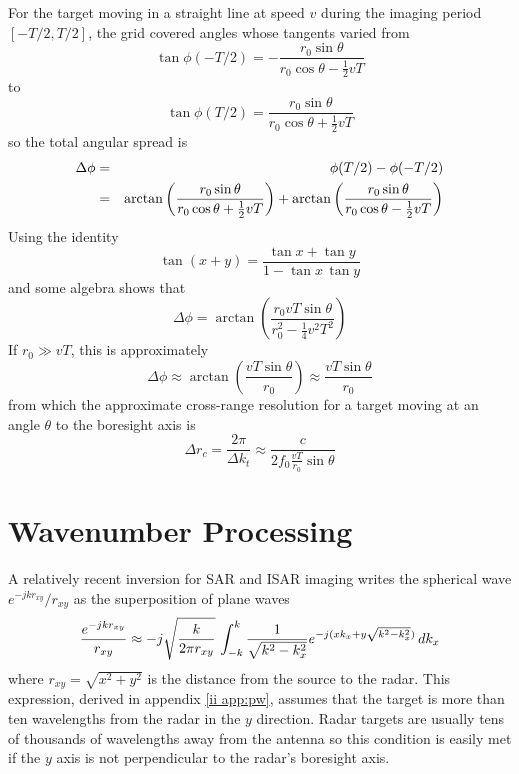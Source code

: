 For the target moving in a straight line at speed $v$ during the imaging
period $[-T/2,T/2]$, the grid covered angles whose tangents varied from 
\begin{equation}
\tan\phi(-T/2)=-\frac{r_0\sin\theta}{r_0\cos\theta-\frac{1}{2}vT}
\end{equation}
to
\begin{equation}
\tan\phi(T/2)=\frac{r_0\sin\theta}{r_0\cos\theta+\frac{1}{2}vT}
\end{equation}
so the total angular spread is 
\begin{eqnarray}
\Delta\phi&=&\phi(T/2)-\phi(-T/2){\nonumber}\\
&=&\arctan\left(\frac{r_0\sin\theta}{r_0\cos\theta+\frac{1}{2}vT}\right)
+\arctan\left(\frac{r_0\sin\theta}{r_0\cos\theta-\frac{1}{2}vT}\right)
\end{eqnarray}
Using the identity
\begin{equation}
\tan(x+y)=\frac{\tan x + \tan y}{1-\tan x\,\tan y}
\end{equation}
and some algebra shows that
\begin{equation}
\Delta\phi=\arctan\left(\frac{r_0vT\sin\theta}{r_0^2-\frac{1}{4}v^2T^2}\right)
\end{equation}
If $r_0\gg vT$, this is approximately
\begin{equation}
\Delta\phi\approx\arctan\left(\frac{vT\sin\theta}{r_0}\right)
\approx\frac{vT\sin\theta}{r_0}
\end{equation}
from which the approximate cross-range resolution for a target moving at an
angle $\theta $ to the boresight axis is
\begin{equation}
\Delta r_c=\frac{2\pi}{\Delta k_t}\approx\frac{c}{2f_0\frac{vT}{r_0}\sin\theta}
\end{equation}


\section{Wavenumber Processing}

A relatively recent inversion for SAR and ISAR imaging writes the spherical
wave $e^{-jkr_{xy}}/r_{xy}$ as the superposition of plane waves
\begin{equation}\label{ii eqn:pw decomp}
\frac{\displaystyle e^{-jkr_{xy}}}{r_{xy}}\approx
-j\sqrt{\frac{k}{2\pi r_{xy}}}\,
\int_{-k}^k \frac{1}{\sqrt{k^2-k_x^2}}e^{-j(xk_x+y\sqrt{k^2-k_x^2})}\,dk_x
\end{equation}
where $r_{xy}=\sqrt{x^2+y^2}$ is the distance from the source to the radar. 
This expression, derived in appendix \ref{ii app:pw}, assumes that the
target is more than ten wavelengths from the radar in the $y$ direction. 
Radar targets are usually tens of thousands of wavelengths away from the
antenna so this condition is easily met if the $y$ axis is not perpendicular
to the radar's boresight axis.

